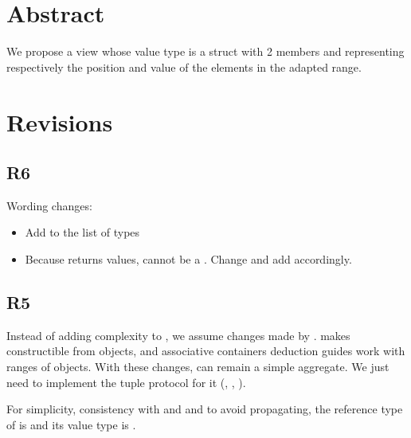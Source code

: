 \documentclass{wg21}
\title{\tcode{views::enumerate}}
\author{Corentin Jabot}{corentin.jabot@gmail.com}
\begin{document}
\maketitle


\section{Abstract}

We propose a view  whose value type is a struct with 2 members  and 
representing respectively the position and value of the elements in the adapted range.

\section{Revisions}


\subsection{R6}
Wording changes:
\begin{itemize}
    \item Add  to the list of  types
    \item Because  returns values,  
    cannot be a . Change  and add  accordingly.
\end{itemize}

\subsection{R5}

Instead of adding complexity to , we assume changes made by .
 makes  constructible from  objects, and associative containers deduction guides work
with ranges of  objects.
With these changes,  can remain a simple aggregate. We just need to implement the tuple protocol for it (, , ).

For simplicity, consistency with  and  and to avoid  propagating,
the reference type of  is   and its value type is .
\end{document}
